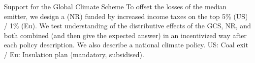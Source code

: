 \begin{framefont}{\small}
\begin{frame}{Support for the Global Climate Scheme\label{}}
\bbvsp \ip To offset the losses of the median emitter, we design a  (NR) funded by increased income taxes on the top 5\% (US) / 1\% (Eu).
\ip We test understanding of the distributive effects of the GCS, NR, and both combined (and then give the expected answer) in an incentivized way after each policy description.%
\ip We also describe a national climate policy. US: Coal exit / Eu: Insulation plan (mandatory, subsidised).
\ee \vspace{-.3cm}
    \begin{figure}
        \centering %
    \end{figure}
\end{frame}


\end{framefont}
